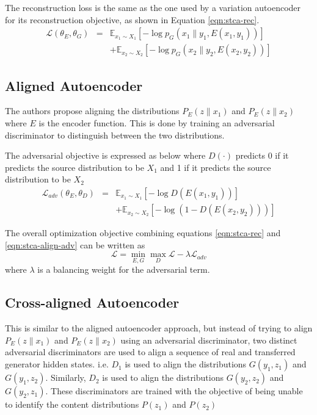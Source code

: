 The reconstruction loss is the same as the one used by a variation autoencoder for its reconstruction objective, as shown in Equation \ref{eqn:stca-rec}.
\begin{eqnarray} \label{eqn:stca-rec}
	\mathcal{L}(\theta_E,\theta_G)
	&=& \mathbb{E}_{x_1 \sim X_1}[-\log p_G(x_1\|y_1,E(x_1, y_1))] \nonumber \\
	& & + \mathbb{E}_{x_2 \sim X_2}[-\log p_G(x_2\|y_2,E(x_2, y_2))]
\end{eqnarray}

\subsection{Aligned Autoencoder}

The authors propose aligning the distributions $P_E(z\|x_1)$ and $P_E(z\|x_2)$ where $E$ is the encoder function. This is done by training an adversarial discriminator to distinguish between the two distributions.

The adversarial objective is expressed as below where $D(\cdot)$ predicts 0 if it predicts the source distribution to be $X_1$ and 1 if it predicts the source distribution to be $X_2$
\begin{eqnarray} \label{eqn:stca-align-adv}
	\mathcal{L}_{adv}(\theta_E,\theta_D)
	&=& \mathbb{E}_{x_1 \sim X_1}[-\log D(E(x_1,y_1))] \nonumber \\
	& & + \mathbb{E}_{x_2 \sim X_2}[-\log(1 - D(E(x_2,y_2)))]
\end{eqnarray}

The overall optimization objective combining equations \ref{eqn:stca-rec} and \ref{eqn:stca-align-adv} can be written as
\begin{equation}
	\mathcal{L} = \operatorname*{min}_{E,G} \operatorname*{max}_{D} \mathcal{L} - \lambda \mathcal{L}_{adv}
\end{equation}
where $\lambda$ is a balancing weight for the adversarial term.

\subsection{Cross-aligned Autoencoder}

This is similar to the aligned autoencoder approach, but instead of trying to align $P_E(z\|x_1)$ and $P_E(z\|x_2)$ using an adversarial discriminator, two distinct adversarial discriminators are used to align a sequence of real and transferred generator hidden states. i.e. $D_1$ is used to align the distributions $G(y_1, z_1)$ and $G(y_1, z_2)$. Similarly, $D_2$ is used to align the distributions $G(y_2, z_2)$ and $G(y_2, z_1)$. These discriminators are trained with the objective of being unable to identify the content distributions $P(z_1)$ and $P(z_2)$


